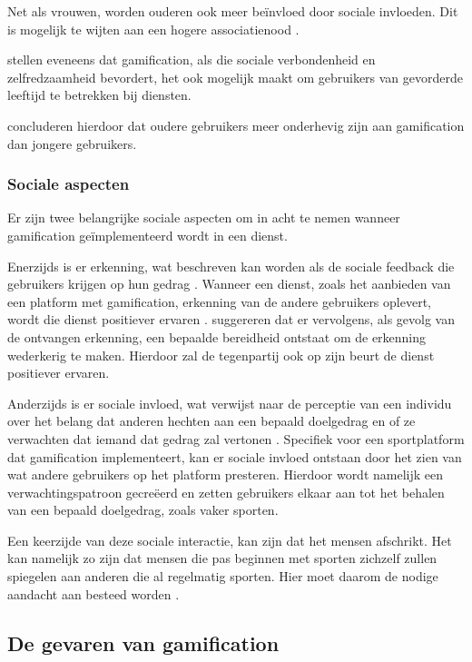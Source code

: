 Net als vrouwen, worden ouderen ook meer beïnvloed door sociale invloeden. Dit is mogelijk te wijten aan een hogere associatienood \autocite{Morris2000, Venkatesh2000, Wang2008}.

\textcite{Arning2007, Czaja2006} stellen eveneens dat gamification, als die sociale verbondenheid en zelfredzaamheid bevordert, het ook mogelijk maakt om gebruikers van gevorderde leeftijd te betrekken bij diensten.

\textcite{PoloPena2020} concluderen hierdoor dat oudere gebruikers meer onderhevig zijn aan gamification dan jongere gebruikers.

\subsubsection{Sociale aspecten}
\label{ssec:sociale_aspecen}
Er zijn twee belangrijke sociale aspecten om in acht te nemen wanneer gamification geïmplementeerd wordt in een dienst.

Enerzijds is er erkenning, wat beschreven kan worden als de sociale feedback die gebruikers krijgen op hun gedrag \autocite{Cheung2011}.
Wanneer een dienst, zoals het aanbieden van een platform met gamification, erkenning van de andere gebruikers oplevert, wordt die dienst positiever ervaren \autocite{Preece2001}.
\textcite{Hamari2013} suggereren dat er vervolgens, als gevolg van de ontvangen erkenning, een bepaalde bereidheid ontstaat om de erkenning wederkerig te maken. Hierdoor zal de tegenpartij ook op zijn beurt de dienst positiever ervaren.

Anderzijds is er sociale invloed, wat verwijst naar de perceptie van een individu over het belang dat anderen hechten aan een bepaald doelgedrag en of ze verwachten dat iemand dat gedrag zal vertonen \autocite{Ajzen1991}. Specifiek voor een sportplatform dat gamification implementeert, kan er sociale invloed ontstaan door het zien van wat andere gebruikers op het platform presteren. Hierdoor wordt namelijk een verwachtingspatroon gecreëerd en zetten gebruikers elkaar aan tot het behalen van een bepaald doelgedrag, zoals vaker sporten.

Een keerzijde van deze sociale interactie, kan zijn dat het mensen afschrikt. Het kan namelijk zo zijn dat mensen die pas beginnen met sporten zichzelf zullen spiegelen aan anderen die al regelmatig sporten. Hier moet daarom de nodige aandacht aan besteed worden \autocite{Jong2010}.

\subsection{De gevaren van gamification}
\label{ssec:gevaren}

